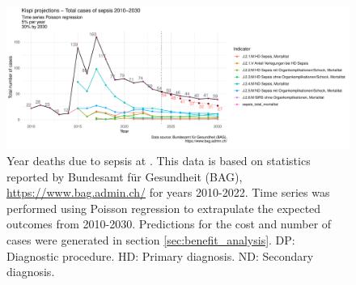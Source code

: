 \begin{figure}[h] \hspace*{0cm} 
\begin{center}
	\includegraphics[width=1\textwidth]{../stats/foph_key_stats/output/p_cases_sepsis_kispi_yearly_forecast}
	\caption{Year deaths due to sepsis at \kispi.
	This data is based on statistics reported by Bundesamt für Gesundheit (BAG), 
	\url{https://www.bag.admin.ch/} for years 2010-2022. 
	Time series was performed using Poisson regression to extrapulate the expected outcomes from 2010-2030.
	Predictions for the cost and number of cases were generated in section 
	\ref{sec:benefit_analysis}.	
	DP: Diagnostic procedure.
HD: Primary diagnosis.
ND: Secondary diagnosis.
}
	\label{fig:p_cases_sepsis_kispi_yearly_forecast_exec}
\end{center}
\end{figure}























